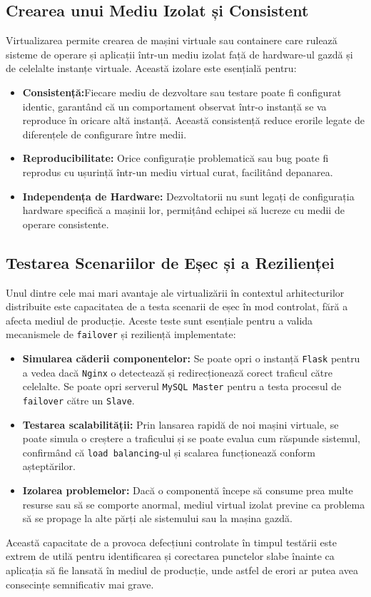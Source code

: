 \documentclass[12pt, a4paper, oneside, romanian]{teza-upb}
\begin{document}
\subsection*{Crearea unui Mediu Izolat și Consistent}
Virtualizarea permite crearea de mașini virtuale sau containere care rulează sisteme de operare și aplicații într-un mediu izolat față de hardware-ul gazdă și de celelalte instanțe virtuale. Această izolare este esențială pentru:
\begin{itemize}
	\item \textbf{Consistență:}Fiecare mediu de dezvoltare sau testare poate fi configurat identic, garantând că un comportament observat într-o instanță se va reproduce în oricare altă instanță. Această consistență reduce erorile legate de diferențele de configurare între medii.
	\item \textbf{Reproducibilitate:} Orice configurație problematică sau bug poate fi reprodus cu ușurință într-un mediu virtual curat, facilitând depanarea.
	\item \textbf{Independența de Hardware:} Dezvoltatorii nu sunt legați de configurația hardware specifică a mașinii lor, permițând echipei să lucreze cu medii de operare consistente.
\end{itemize}


\subsection*{Testarea Scenariilor de Eșec și a Rezilienței}
Unul dintre cele mai mari avantaje ale virtualizării în contextul arhitecturilor distribuite este capacitatea de a testa scenarii de eșec în mod controlat, fără a afecta mediul de producție. Aceste teste sunt esențiale pentru a valida mecanismele de \texttt{failover} și reziliență implementate:
\begin{itemize}
	\item \textbf{Simularea căderii componentelor:} Se poate opri o instanță \texttt{Flask} pentru a vedea dacă \texttt{Nginx} o detectează și redirecționează corect traficul către celelalte. Se poate opri serverul \texttt{MySQL Master} pentru a testa procesul de \texttt{failover} către un \texttt{Slave}.
	\item \textbf{Testarea scalabilității:} Prin lansarea rapidă de noi mașini virtuale, se poate simula o creștere a traficului și se poate evalua cum răspunde sistemul, confirmând că \texttt{load balancing}-ul și scalarea funcționează conform așteptărilor.
	\item \textbf{Izolarea problemelor:} Dacă o componentă începe să consume prea multe resurse sau să se comporte anormal, mediul virtual izolat previne ca problema să se propage la alte părți ale sistemului sau la mașina gazdă.
\end{itemize}
Această capacitate de a provoca defecțiuni controlate în timpul testării este extrem de utilă pentru identificarea și corectarea punctelor slabe înainte ca aplicația să fie lansată în mediul de producție, unde astfel de erori ar putea avea consecințe semnificativ mai grave.
\end{document}
